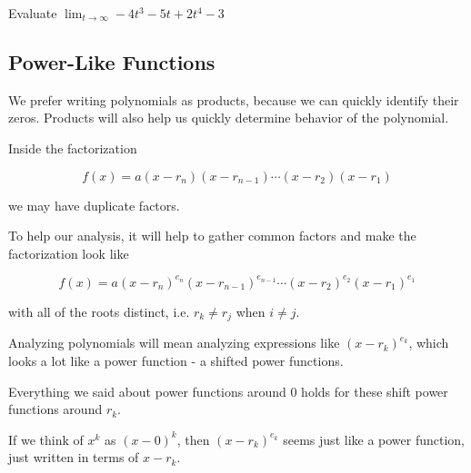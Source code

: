 \documentclass{ximera}
\begin{document}
\begin{question}

Evaluate $\lim_{t \to \infty} -4 t^3 - 5 t + 2 t^4  - 3$


\begin{multipleChoice}
\choice {$-\infty$}
\choice [correct]{$\infty$}
\end{multipleChoice}

\end{question}










\subsection{Power-Like Functions}

We prefer writing polynomials as products, because we can quickly identify their zeros.  Products will also help us quickly determine behavior of the polynomial.

Inside the factorization

\[   f(x) = a (x-r_n)(x-r_{n-1})  \cdots (x-r_2)(x-r_1)  \]

we may have duplicate factors.

To help our analysis, it will help to gather common factors and make the factorization look like

\[   f(x) = a (x-r_n)^{e_n}(x-r_{n-1})^{e_{n-1}}  \cdots (x-r_2)^{e_2}(x-r_1)^{e_1}  \]

with all of the roots distinct, i.e. $r_k \ne r_j$ when $i \ne j$.



Analyzing polynomials will mean analyzing expressions like $(x-r_k)^{e_k}$, which looks a lot like a power function - a shifted power functions.

Everything we said about power functions around $0$ holds for these shift power functions around $r_k$. 


If we think of $x^k$ as $(x-0)^k$, then $(x-r_k)^{e_k}$ seems just like a power function, just written in terms of $x-r_k$.
\end{document}
